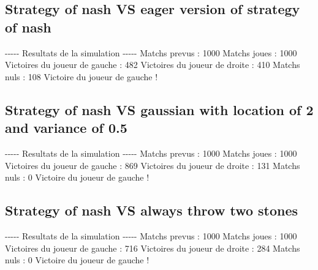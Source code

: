 \documentclass{article}%
\begin{document}
%
\subsection{Strategy of nash VS eager version of strategy of nash}%
\label{subsec:Strategy of nash VS eager version of strategy of nash}%
{-}{-}{-}{-}{-} Resultats de la simulation {-}{-}{-}{-}{-}\newline%
		\newline%
Matchs prevus : 1000\newline%
Matchs joues : 1000\newline%
\newline%
Victoires du joueur de gauche : 482\newline%
Victoires du joueur de droite : 410\newline%
Matchs nuls : 108\newline%
\newline%
Victoire du joueur de gauche !

%
\subsection{Strategy of nash VS gaussian with location of 2 and variance of 0.5}%
\label{subsec:Strategy of nash VS gaussian with location of 2 and variance of 0.5}%
{-}{-}{-}{-}{-} Resultats de la simulation {-}{-}{-}{-}{-}\newline%
		\newline%
Matchs prevus : 1000\newline%
Matchs joues : 1000\newline%
\newline%
Victoires du joueur de gauche : 869\newline%
Victoires du joueur de droite : 131\newline%
Matchs nuls : 0\newline%
\newline%
Victoire du joueur de gauche !

%
\subsection{Strategy of nash VS always throw two stones}%
\label{subsec:Strategy of nash VS always throw two stones}%
{-}{-}{-}{-}{-} Resultats de la simulation {-}{-}{-}{-}{-}\newline%
		\newline%
Matchs prevus : 1000\newline%
Matchs joues : 1000\newline%
\newline%
Victoires du joueur de gauche : 716\newline%
Victoires du joueur de droite : 284\newline%
Matchs nuls : 0\newline%
\newline%
Victoire du joueur de gauche !
\end{document}
